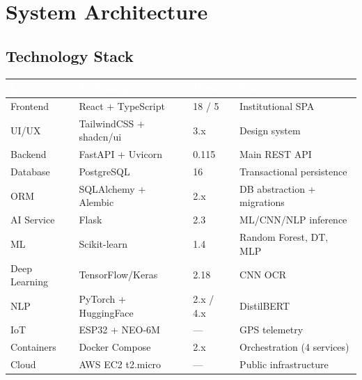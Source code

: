 \documentclass[12pt,a4paper,twoside]{report}
\begin{document}
\chapter{System Architecture}

\section{Technology Stack}

\begin{center}
\begin{tabularx}{\textwidth}{|l|l|l|X|}
\hline
\rowcolor{tableHdr}
\textcolor{white}{\textbf{Layer}} & \textcolor{white}{\textbf{Technology}} &
\textcolor{white}{\textbf{Version}} & \textcolor{white}{\textbf{Role}} \\
\hline
\rowcolor{rowOdd}Frontend     & React + TypeScript    & 18 / 5    & Institutional SPA \\
\hline\rowcolor{rowEven}UI/UX       & TailwindCSS + shadcn/ui & 3.x     & Design system \\
\hline\rowcolor{rowOdd}Backend      & FastAPI + Uvicorn     & 0.115     & Main REST API \\
\hline\rowcolor{rowEven}Database     & PostgreSQL            & 16        & Transactional persistence \\
\hline\rowcolor{rowOdd}ORM          & SQLAlchemy + Alembic  & 2.x       & DB abstraction + migrations \\
\hline\rowcolor{rowEven}AI Service   & Flask                 & 2.3       & ML/CNN/NLP inference \\
\hline\rowcolor{rowOdd}ML           & Scikit-learn          & 1.4       & Random Forest, DT, MLP \\
\hline\rowcolor{rowEven}Deep Learning & TensorFlow/Keras     & 2.18      & CNN OCR \\
\hline\rowcolor{rowOdd}NLP          & PyTorch + HuggingFace & 2.x / 4.x & DistilBERT \\
\hline\rowcolor{rowEven}IoT          & ESP32 + NEO-6M        & —         & GPS telemetry \\
\hline\rowcolor{rowOdd}Containers   & Docker Compose        & 2.x       & Orchestration (4 services) \\
\hline\rowcolor{rowEven}Cloud        & AWS EC2 t2.micro      & —         & Public infrastructure \\
\hline
\end{tabularx}
\end{center}
\end{document}
